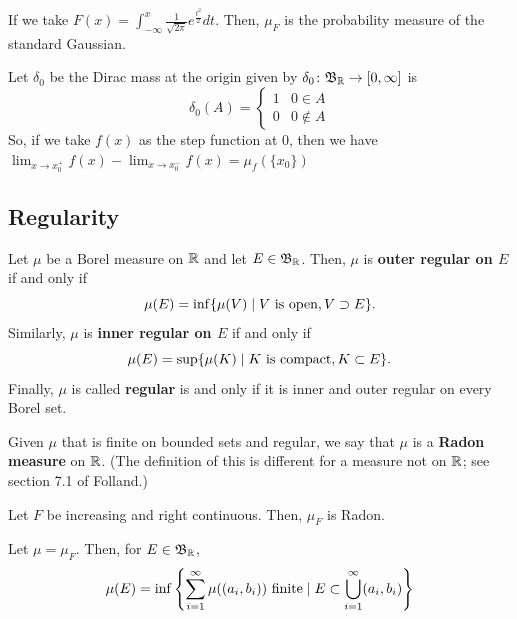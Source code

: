 \documentclass[11pt,leqno,oneside]{amsbook}
\numberwithin{thm}{section}
\renewcommand{\de}{\textbf} %
\begin{document}
\begin{example}
  If we take $F(x) = \int_{-\infty}^x \frac{1}{\sqrt{2\pi}}
  e^{\frac{t^2}{2}} dt$. Then, $\mu_F$ is the probability measure of
  the standard Gaussian.
\end{example}
\begin{example}
  Let $\delta_0$ be the Dirac mass at the origin given by $\delta_0
  \colon \mathfrak{B}_{\mathbb R} \to [0,\infty]$ is \[
    \delta_0(A) =
    \begin{cases}
      1 & 0 \in A \\
      0 & 0 \not \in A
    \end{cases}
  \]
  So, if we take $f(x)$ as the step function at $0$,
  then we have $\lim_{x \to x_0^+} f(x) - \lim_{x \to x_0^-} f(x) = \mu_f(\{x_0\})$
\end{example}
\subsection{Regularity}
\begin{defn}
  Let $\mu$ be a Borel measure on ${\mathbb R}$ and let $E \in \mathfrak{B}_{\mathbb R}$. Then,
  $\mu$ is \de{outer regular on $E$} if and only if \[
    \mu(E) = \inf \{\mu(V) \mid V \text{ is open}, V \supset E\}.
  \]
  Similarly, $\mu$ is \de{inner regular on $E$} if and only if \[
    \mu(E) = \sup \{\mu(K) \mid K \text{ is compact}, K \subset E\}.
  \]
  Finally, $\mu$ is called \de{regular} is and only if it is inner and
  outer regular on every Borel set.
\end{defn}
\begin{defn}
  Given $\mu$ that is finite on bounded sets and regular, we say that
  $\mu$ is a \de{Radon measure} on ${\mathbb R}$. (The definition of this is
  different for a measure not on ${\mathbb R}$; see section 7.1 of Folland.)
\end{defn}
\begin{thm}\label{radon-thm}
  Let $F$ be increasing and right continuous. Then, $\mu_F$ is Radon.
\end{thm}
\begin{lem}
  Let $\mu = \mu_F$. Then, for $E \in \mathfrak{B}_{\mathbb R}$, \[
    \mu(E) = \inf \left\{ \sum_{i=1}^\infty \mu((a_i,b_i)) \text{
        finite} \mid E
      \subset \bigcup_{i=1}^\infty (a_i,b_i) \right\}
  \]
\end{lem}
\end{document}
